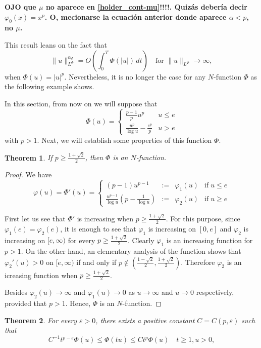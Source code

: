 \documentclass[twoside]{article}
\newtheorem{thm}{Theorem}[section]
\theoremstyle{remark}
\newcommand{\orlnor}{\|_{L^{\Phi}}}
\renewcommand{\leq}{\leqslant}
\renewcommand{\geq}{\geqslant}
\begin{document}
{\bf OJO que $\mu$ no aparece en \eqref{holder_cont-mu}!!!!. Quiz\'as deber\'ia decir $\varphi_0(x)=x^p$. O, mecionarse la ecuaci\'on anterior donde aparece $\alpha<p$, no $\mu$.} 

This result leans on the  fact that
\begin{equation}
 \|u\orlnor^{\alpha_{\Phi}}=O\left(\int_0^T \Phi(|u|)\,dt\right)\quad\text{for } \|u\orlnor\to\infty,
\end{equation}
when  $\Phi(u)=|u|^p$.
Nevertheless, it is no longer the case  for any $N$-function $\Phi$ as the following example shows.

In this section, from now on we will suppose that
\[\Phi(u)=
\left\{
\begin{array}{ll}
\frac{p-1}{p}u^p&u\leq e
\\
\frac{u^p}{\log u}-\frac{e^p}{p}&u>e
\end{array}
\right.\]
with $p>1$. Next, we will establish some properties of this function $\Phi$.

\begin{thm}
If $p\geq \frac{1+\sqrt 2}{2}$, then $\Phi$ is an $N$-function.
\end{thm}


\begin{proof}
We have
\[\varphi(u)=\Phi'(u)=\left\{
\begin{array}{cccc}
(p-1)u^{p-1}&:=&\varphi_1(u)& \mbox{if}\;u\leq e
\\
\frac{u^{p-1}}{\log u}(p-\frac{1}{\log u})&:=&\varphi_2(u)&\mbox{if}\; u\geq e
\end{array}
\right.
\]

First let us see that $\Phi'$ is increasing when $p\geq \frac{1+\sqrt {2}}{2}$.
For this purpose, since $\varphi_1(e)=\varphi_2(e)$, it is enough to see that $\varphi_1$ is increasing  on $[0,e]$ and $\varphi_2$ is increasing on
$[e,\infty)$ for every $p\geq \frac{1+\sqrt {2}}{2}$. Clearly
$\varphi_1$ is an increasing function for $p>1$.  On the other hand, an elementary analysis of the function shows that
$\varphi_2'(u)>0$ on $[e,\infty)$ if and only if
 $p \notin(\frac{1-\sqrt2}{2},\frac{1+\sqrt2}{2})$.  Therefore $\varphi_2$ is an icreasing function when $p\geq \frac{1+\sqrt2}{2}$.

 Besides $\varphi_2(u)\to \infty$ and  $\varphi_1(u)\to 0$  as $u \to  \infty$ and $u\to 0$  respectively, provided that $p>1$. Hence, $\Phi$ is an $N$-function.
\end{proof}


\begin{thm} For every $\varepsilon>0$, there exists a positive constant $C=C(p,\varepsilon)$  such that
\begin{equation}\label{cota-sup-indices}
C^{-1}t^{p-\varepsilon}\Phi(u)\leq \Phi(tu) \leq Ct^p\Phi(u)\quad t\geq 1, u>0,
\end{equation}
\end{thm}
\end{document}
